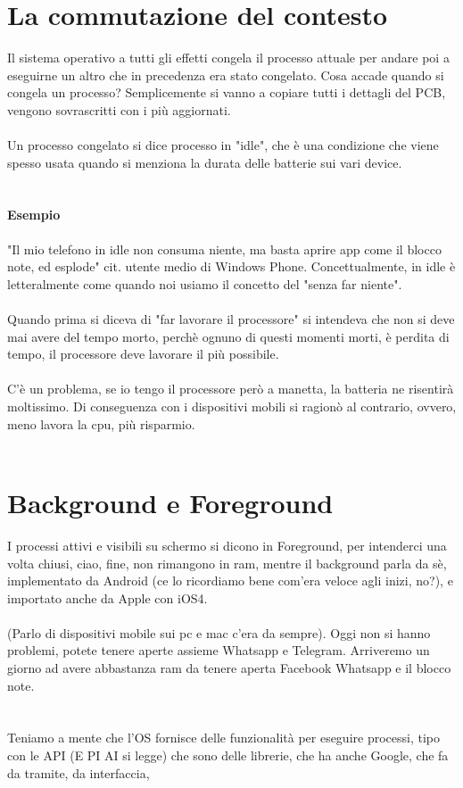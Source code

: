 \documentclass[12pt, a4paper, openany, twoside]{book}
\begin{document}
\section{La commutazione del contesto}
Il sistema operativo a tutti gli effetti congela il processo attuale per andare
poi a eseguirne un altro che in precedenza era stato congelato. Cosa accade
quando si congela un processo? Semplicemente si vanno a copiare tutti i dettagli
del PCB, vengono sovrascritti con i più aggiornati. \\ \\
Un processo congelato si dice processo in "idle", che è una condizione che viene
spesso usata quando si menziona la durata delle batterie sui vari device. \\ \\
\paragraph{Esempio}
"Il mio telefono in idle non consuma niente, ma basta aprire app come il 
blocco note, ed esplode" cit. utente medio di Windows Phone. Concettualmente,
in idle è letteralmente come quando noi usiamo il concetto del "senza far 
niente".\\ \\
Quando prima si diceva di "far lavorare il processore" si intendeva che non 
si deve mai avere del tempo morto, perchè ognuno di questi momenti morti, è 
perdita di tempo, il processore deve lavorare il più possibile. \\ \\
C'è un problema, se io tengo il processore però a manetta, la batteria ne risentirà
moltissimo. Di conseguenza con i dispositivi mobili si ragionò al contrario, 
ovvero, meno lavora la cpu, più risparmio. \\ \\
\section{Background e Foreground}
I processi attivi e visibili su schermo si dicono in Foreground, per intenderci
una volta chiusi, ciao, fine, non rimangono in ram, mentre il background parla
da sè, implementato da Android (ce lo ricordiamo bene com'era veloce agli inizi,
no?), e importato anche da Apple con iOS4. \\ \\
(Parlo di dispositivi mobile sui pc e mac c'era da sempre).
Oggi non si hanno problemi, potete tenere aperte 
assieme Whatsapp e Telegram. Arriveremo un giorno ad avere abbastanza ram da 
tenere aperta Facebook Whatsapp e il blocco note.
\\ \\ \\
Teniamo a mente che l'OS fornisce delle funzionalità per eseguire processi, tipo
con le API (E PI AI si legge) che sono delle librerie, che ha anche Google, 
che fa da tramite, da interfaccia,
\end{document}

